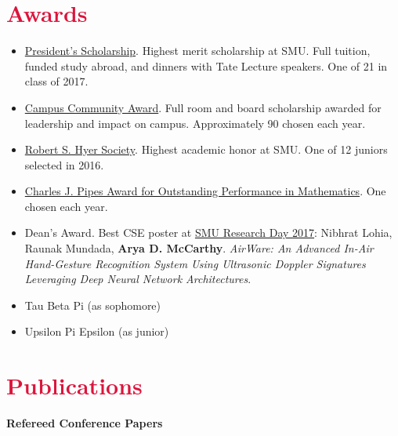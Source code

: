 \documentclass[margin, 10pt]{res} %
\let\oldsection\section
\renewcommand{\section}[1]{\oldsection{\textcolor{crimson}{#1}}}
\begin{document}
\begin{resume}

\section{Awards}

\begin{itemize}
\item \href{https://www.smu.edu/Academics/PS}{President's Scholarship}. Highest merit scholarship at SMU\@. Full tuition, funded study abroad, and dinners with Tate Lecture speakers. One of 21 in class of 2017.
\item \href{https://www.smu.edu/Academics/PS/Benefits}{Campus Community Award}. Full room and board scholarship awarded for leadership and impact on campus. Approximately 90 chosen each year.
\item \href{https://www.smu.edu/EnrollmentServices/Registrar/AcademicCeremonies/HonorsConvocation/HonorSocieties}{Robert S. Hyer Society}. Highest academic honor at SMU\@. One of 12 juniors selected in 2016.
\item \href{https://www.smu.edu/EnrollmentServices/Registrar/AcademicCeremonies/HonorsConvocation/AwardRecipients}{Charles J. Pipes Award for Outstanding Performance in Mathematics}. One chosen each year.
\item Dean's Award. Best CSE poster at \href{http://www.smu.edu/graduate/CurrentStudents/ResearchDay}{SMU Research Day 2017}: Nibhrat Lohia, Raunak Mundada, \textbf{Arya D. McCarthy}. \emph{AirWare: An Advanced In-Air Hand-Gesture Recognition System Using Ultrasonic Doppler Signatures Leveraging Deep Neural Network Architectures}.
\item Tau Beta Pi (as sophomore)
\item Upsilon Pi Epsilon (as junior)
\end{itemize}


\section{Publications}
\textbf{Refereed Conference Papers}


\end{resume}
\end{document}
